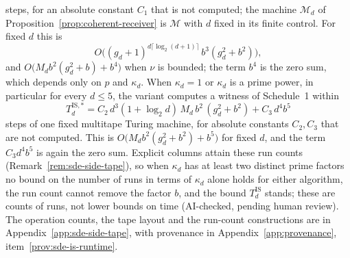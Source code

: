 \begin{remark}
\[\]
steps, for an absolute constant $C_1$ that is not computed; the machine $\mathcal{M}_d$ of Proposition~\ref{prop:coherent-receiver} is $\mathcal{M}$ with $d$ fixed in its finite control. For fixed $d$ this is\[O\bigl((g_d+1)^{d\lceil\log_2(d+1)\rceil}\, b^3 (g_d^2+b^2)\bigr),\]and $O\bigl(M_d b^2(g_d^2+b)+b^4\bigr)$ when $\nu$ is bounded; the term $b^4$ is the zero sum, which depends only on $p$ and $\kappa_d$. When $\kappa_d = 1$ or $\kappa_d$ is a prime power, in particular for every $d \le 5$, the variant computes a witness of Schedule~1 within
\[
  T^{\mathrm{IS},\ast}_d = C_2\, d^3 (1+\log_2 d)\, M_d\, b^2\,(g_d^2 + b^2) + C_3\, d^4 b^5
\]
steps of one fixed multitape Turing machine, for absolute constants $C_2, C_3$ that are not computed. This is $O\bigl(M_d b^2(g_d^2+b^2) + b^5\bigr)$ for fixed $d$, and the term $C_3 d^4 b^5$ is again the zero sum. Explicit columns attain these run counts (Remark~\ref{rem:sde-side-tape}), so when $\kappa_d$ has at least two distinct prime factors no bound on the number of runs in terms of $\kappa_d$ alone holds for either algorithm, the run count cannot remove the factor $b$, and the bound $T^{\mathrm{IS}}_d$ stands; these are counts of runs, not lower bounds on time (AI-checked, pending human review). The operation counts, the tape layout and the run-count constructions are in Appendix~\ref{app:sde-side-tape}, with provenance in Appendix~\ref{app:provenance}, item~\ref{prov:sde-is-runtime}.
\end{remark}

